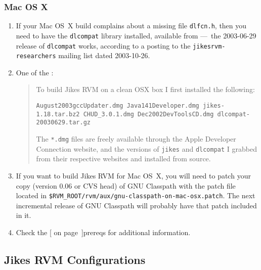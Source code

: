 \subsubsection{Mac OS X}\label{OSX-install}

\begin{enumerate}
\item
If your Mac OS~X build complains about a missing file  \texttt{dlfcn.h}, then 
you need to have the \texttt{dlcompat} library installed, available from 
---~the 2003-06-29 release of \texttt{dlcompat} works, according to a posting to
the \texttt{jikesrvm-researchers} mailing list dated 2003-10-26.

\item
One of the :
\begin{quote}
To build Jikes RVM on a clean OSX box I first installed the following:

\texttt{August2003gccUpdater.dmg  Java141Developer.dmg      jikes-1.18.tar.bz2
CHUD\_3.0.1.dmg            Dec2002DevToolsCD.dmg     dlcompat-20030629.tar.gz}

The \texttt{*.dmg} files are freely available through the Apple
Developer Connection 
website, and the versions of \texttt{jikes} and \texttt{dlcompat} I grabbed from their
respective websites and installed from source.
\end{quote}

\item
If you want to build Jikes RVM for Mac OS~X, you will need to patch
your copy (version 0.06 or CVS head) of GNU Classpath with the patch
file located
in \texttt{\$RVM\_ROOT/\-rvm/\-aux/\-gnu-classpath-on-mac-osx.patch}.  The
next incremental release of GNU Classpath will probably have that
patch included in it.

\item
Check the [ on page~\Pageref]{prereqs} for additional
information. 

\end{enumerate}


\subsection{Jikes RVM Configurations}\label{configs}%
%

